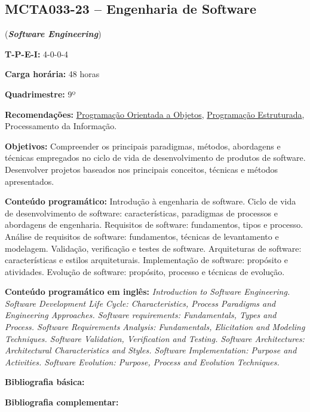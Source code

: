 \documentclass[12pt,a4paper]{article}
\begin{document}
\subsection*{MCTA033-23 -- Engenharia de Software}
\label{disc:es}

(\textbf{\textit{Software Engineering}})

\begin{center}
    \begin{minipage}{0.85\textwidth}
    
        \textbf{T-P-E-I:} 4-0-0-4
    
        \textbf{Carga horária:} 48 horas
        
        \textbf{Quadrimestre:} 9º 
        
        \textbf{Recomendações:} 
        \hyperref[disc:poo]{Programação Orientada a Objetos},
        \hyperref[disc:pe]{Programação Estruturada},
        Processamento da Informação.
        
    \end{minipage}
\end{center}

\textbf{Objetivos:}
Compreender os principais paradigmas, métodos, abordagens e técnicas empregados
no ciclo de vida de desenvolvimento de produtos de software. Desenvolver
projetos baseados nos principais conceitos, técnicas e métodos apresentados.

\textbf{Conteúdo programático:}
Introdução à engenharia de software.
Ciclo de vida de desenvolvimento de software: características, paradigmas de
processos e abordagens de engenharia.
Requisitos de software: fundamentos, tipos e processo.
Análise de requisitos de software: fundamentos, técnicas de levantamento e modelagem.
Validação, verificação e testes de software.
Arquiteturas de software: características e estilos arquiteturais.
Implementação de software: propósito e atividades.
Evolução de software: propósito, processo e técnicas de evolução. 

\textbf{Conteúdo programático em inglês:}
\textit{Introduction to Software Engineering. 
Software Development Life Cycle: Characteristics, Process Paradigms and Engineering Approaches. 
Software requirements: Fundamentals, Types and Process. 
Software Requirements Analysis: Fundamentals, Elicitation and Modeling Techniques. 
Software Validation, Verification and Testing. 
Software Architectures: Architectural Characteristics and Styles. 
Software Implementation: Purpose and Activities. 
Software Evolution: Purpose, Process and Evolution Techniques.}

\newrefsection
\textbf{Bibliografia básica:}
\nocite{2011-sommerville, 2020-valente, 2014-teles} 
\printbibliography

\newrefsection
\textbf{Bibliografia complementar:}
\nocite{2004-ambler, 2002-ambler, 2013-beck, 2004-fowler,  2009-martin}
\printbibliography
\end{document}
